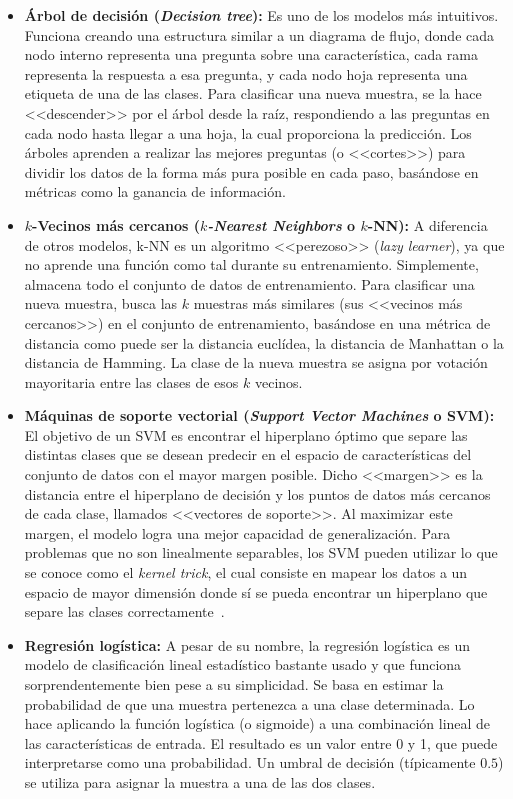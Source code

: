 \begin{itemize}
	\item \textbf{Árbol de decisión (\textit{Decision tree}):} Es uno de los modelos más intuitivos. Funciona creando una estructura similar a un diagrama de flujo, donde cada nodo interno representa una pregunta sobre una característica, cada rama representa la respuesta a esa pregunta, y cada nodo hoja representa una etiqueta de una de las clases. Para clasificar una nueva muestra, se la hace <<descender>> por el árbol desde la raíz, respondiendo a las preguntas en cada nodo hasta llegar a una hoja, la cual proporciona la predicción. Los árboles aprenden a realizar las mejores preguntas (o <<cortes>>) para dividir los datos de la forma más pura posible en cada paso, basándose en métricas como la ganancia de información.~\cite{breiman2017classification}
	
	\item \textbf{$k$-Vecinos más cercanos (\textit{$k$-Nearest Neighbors} o $k$-NN):} A diferencia de otros modelos, k-NN es un algoritmo <<perezoso>> (\textit{lazy learner}), ya que no aprende una función como tal durante su entrenamiento. Simplemente, almacena todo el conjunto de datos de entrenamiento. Para clasificar una nueva muestra, busca las $k$ muestras más similares (sus <<vecinos más cercanos>>) en el conjunto de entrenamiento, basándose en una métrica de distancia como puede ser la distancia euclídea, la distancia de Manhattan o la distancia de Hamming. La clase de la nueva muestra se asigna por votación mayoritaria entre las clases de esos $k$ vecinos.~\cite{cover1967nearest}
	
	\item \textbf{Máquinas de soporte vectorial (\textit{Support Vector Machines} o SVM):} El objetivo de un SVM es encontrar el hiperplano óptimo que separe las distintas clases que se desean predecir en el espacio de características del conjunto de datos con el mayor margen posible. Dicho <<margen>> es la distancia entre el hiperplano de decisión y los puntos de datos más cercanos de cada clase, llamados <<vectores de soporte>>. Al maximizar este margen, el modelo logra una mejor capacidad de generalización. Para problemas que no son linealmente separables, los SVM pueden utilizar lo que se conoce como el \textit{kernel trick}, el cual consiste en mapear los datos a un espacio de mayor dimensión donde sí se pueda encontrar un hiperplano que separe las clases correctamente~\cite{cortes1995support}.

	\item \textbf{Regresión logística:} A pesar de su nombre, la regresión logística es un modelo de clasificación lineal estadístico bastante usado y que funciona sorprendentemente bien pese a su simplicidad. Se basa en estimar la probabilidad de que una muestra pertenezca a una clase determinada. Lo hace aplicando la función logística (o sigmoide) a una combinación lineal de las características de entrada. El resultado es un valor entre 0 y 1, que puede interpretarse como una probabilidad. Un umbral de decisión (típicamente $0.5$) se utiliza para asignar la muestra a una de las dos clases.
\end{itemize}

